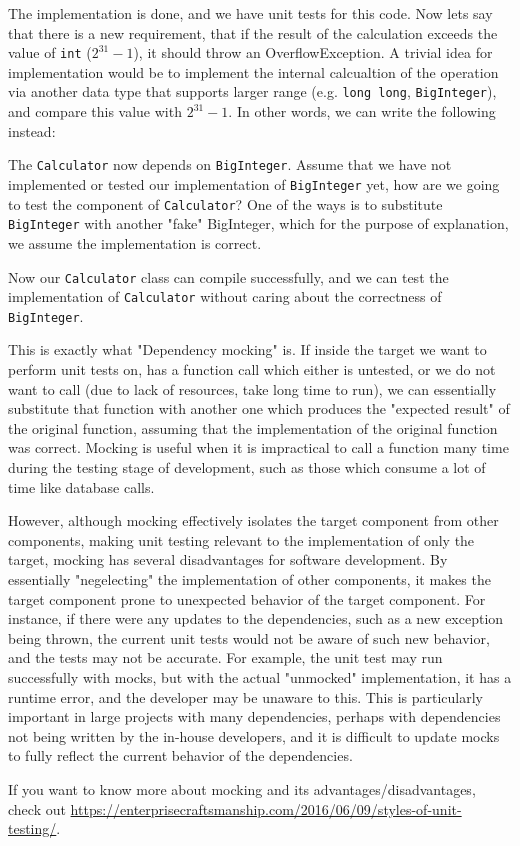 
The implementation is done, and we have unit tests for this code. Now lets say that there is a new requirement, that if the result of the calculation exceeds the value of \texttt{int} ($2^{31}-1$), it should throw an OverflowException. A trivial idea for implementation would be to implement the internal calcualtion of the operation via another data type that supports larger range (e.g. \texttt{long long}, \texttt{BigInteger}), and compare this value with $2^{31}-1$. In other words, we can write the following instead:


The \texttt{Calculator} now depends on \texttt{BigInteger}. Assume that we have not implemented or tested our implementation of \texttt{BigInteger} yet, how are we going to test the component of \texttt{Calculator}? One of the ways is to substitute \texttt{BigInteger} with another "fake" BigInteger, which for the purpose of explanation, we assume the implementation is correct.


Now our \texttt{Calculator} class can compile successfully, and we can test the implementation of \texttt{Calculator} without caring about the correctness of \texttt{BigInteger}. 

This is exactly what "Dependency mocking" is. If inside the target we want to perform unit tests on, has a function call which either is untested, or we do not want to call (due to lack of resources, take long time to run), we can essentially substitute that function with another one which produces the "expected result" of the original function, assuming that the implementation of the original function was correct. Mocking is useful when it is impractical to call a function many time during the testing stage of development, such as those which consume a lot of time like database calls. 

However, although mocking effectively isolates the target component from other components, making unit testing relevant to the implementation of only the target, mocking has several disadvantages for software development. By essentially "negelecting" the implementation of other components, it makes the target component prone to unexpected behavior of the target component. For instance, if there were any updates to the dependencies, such as a new exception being thrown, the current unit tests would not be aware of such new behavior, and the tests may not be accurate. For example, the unit test may run successfully with mocks, but with the actual "unmocked" implementation, it has a runtime error, and the developer may be unaware to this. This is particularly important in large projects with many dependencies, perhaps with dependencies not being written by the in-house developers, and it is difficult to update mocks to fully reflect the current behavior of the dependencies. 

If you want to know more about mocking and its advantages/disadvantages, check out \url{https://enterprisecraftsmanship.com/2016/06/09/styles-of-unit-testing/}. 
